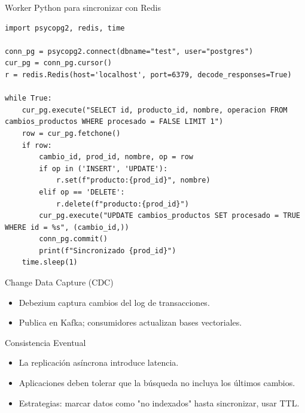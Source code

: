 \documentclass[aspectratio=169, 10pt, xcolor=table]{beamer}
\begin{document}
\begin{frame}[fragile]{Worker Python para sincronizar con Redis}
    \begin{lstlisting}[style=pythonstyle]
import psycopg2, redis, time

conn_pg = psycopg2.connect(dbname="test", user="postgres")
cur_pg = conn_pg.cursor()
r = redis.Redis(host='localhost', port=6379, decode_responses=True)

while True:
    cur_pg.execute("SELECT id, producto_id, nombre, operacion FROM cambios_productos WHERE procesado = FALSE LIMIT 1")
    row = cur_pg.fetchone()
    if row:
        cambio_id, prod_id, nombre, op = row
        if op in ('INSERT', 'UPDATE'):
            r.set(f"producto:{prod_id}", nombre)
        elif op == 'DELETE':
            r.delete(f"producto:{prod_id}")
        cur_pg.execute("UPDATE cambios_productos SET procesado = TRUE WHERE id = %s", (cambio_id,))
        conn_pg.commit()
        print(f"Sincronizado {prod_id}")
    time.sleep(1)
    \end{lstlisting}
\end{frame}

\begin{frame}{Change Data Capture (CDC)}
    \begin{center}
    \end{center}
    \begin{itemize}
        \item Debezium captura cambios del log de transacciones.
        \item Publica en Kafka; consumidores actualizan bases vectoriales.
    \end{itemize}
\end{frame}

\begin{frame}{Consistencia Eventual}
    \begin{itemize}
        \item La replicación asíncrona introduce latencia.
        \item Aplicaciones deben tolerar que la búsqueda no incluya los últimos cambios.
        \item Estrategias: marcar datos como "no indexados" hasta sincronizar, usar TTL.
    \end{itemize}
\end{frame}
\end{document}
